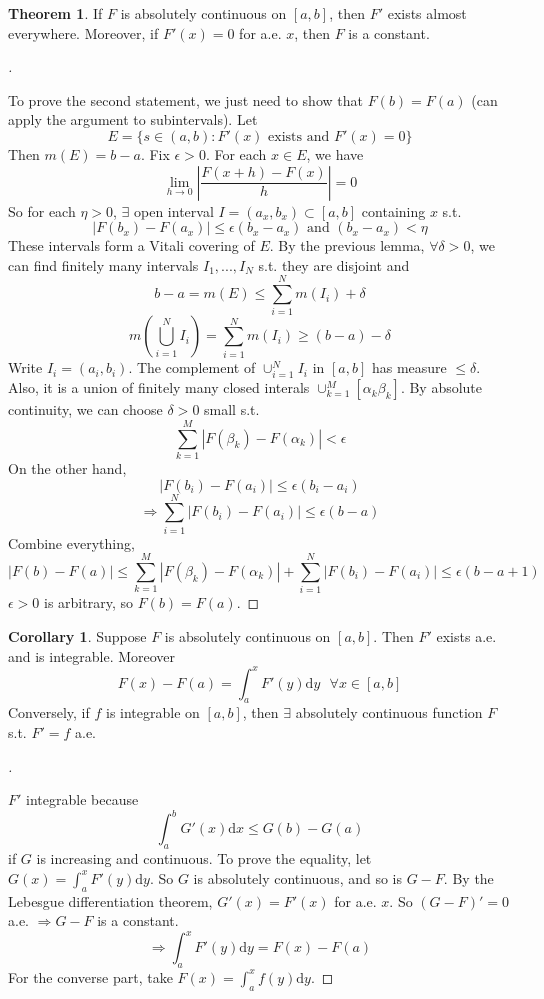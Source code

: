 \documentclass{article}
\newcommand{\sfa}{\text{  } \forall}
\theoremstyle{definition}
\theoremstyle{definition}
\newtheorem{thm}{Theorem}
\newtheorem{cor}{Corollary}
\newenvironment{proofs}[1][\proofname]{%
  \begin{proof}[#1]$ $\par\nobreak\ignorespaces
}{%
  \end{proof}
}
\begin{document}
\begin{thm}
  If $F$ is absolutely continuous on $[a, b]$, then $F'$ exists almost everywhere. Moreover, if $F'(x) = 0$ for a.e. $x$, then $F$ is a constant. 
\end{thm} 

\begin{proofs}
  To prove the second statement, we just need to show that $F(b) = F(a)$ (can apply the argument to subintervals). Let 
  \[
    E = \{ s \in (a, b): F'(x) \text{ exists and } F'(x) = 0\}
  \]
  Then $m(E) = b - a$. Fix $\epsilon > 0$. For each $x \in E$, we have 
  \[
    \lim_{h \to 0} \left|\frac{F(x + h) - F(x)}{h}\right| = 0
  \]
  So for each $\eta > 0$, $\exists $ open interval $I = (a_x, b_x) \subset [a, b]$ containing $x$ s.t.
  \[
    |F(b_x) - F(a_x)| \leq \epsilon (b_x - a_x) \text{ and } (b_x - a_x) < \eta
  \]
  These intervals form a Vitali covering of $E$. By the previous lemma, $\forall \delta >0 $, we can find finitely many intervals $I_1, ..., I_N$ s.t. they are disjoint and 
  \[
    b - a = m(E) \leq \sum_{i = 1}^N m(I_i) + \delta
  \]
  \[
    m \left( \bigcup_{i = 1}^N I_i \right) = \sum_{i = 1}^N m(I_i) \geq (b - a) - \delta 
  \]
  Write $I_i = (a_i, b_i)$. The complement of $\cup_{i = 1}^N I_i$ in $[a, b]$ has measure $\leq \delta$. Also, it is a union of finitely many closed interals $\cup_{k = 1}^M [\alpha_k \beta_k]$. By absolute continuity, we can choose $\delta > 0$ small s.t.
  \[
    \sum_{k = 1}^M |F(\beta_k) - F(\alpha_k)| < \epsilon
  \]
  On the other hand, 
  \[
    |F(b_i) - F(a_i)| \leq \epsilon (b_i - a_i)
  \]
  \[
    \Rightarrow \sum_{i = 1}^N |F(b_i) - F(a_i)| \leq \epsilon (b - a)
  \]
  Combine everything, 
  \[
    |F(b) - F(a)| \leq \sum_{k = 1}^M |F(\beta_k) - F(\alpha_k)| + \sum_{i = 1}^N |F(b_i) - F(a_i)| \leq \epsilon(b - a + 1)
  \]
  $\epsilon > 0$ is arbitrary, so $F(b) = F(a)$. 

\end{proofs}

\begin{cor}
  Suppose $F$ is absolutely continuous on $[a, b]$. Then $F'$ exists a.e. and is integrable. Moreover 
  \[
    F(x) - F(a) = \int_a^x F'(y) \mathrm{d} y \sfa x \in [a, b]
  \]
  Conversely, if $f$ is integrable on $[a, b]$, then $\exists$ absolutely continuous function $F$ s.t. $F' = f$ a.e.
\end{cor}

\begin{proofs}
  $F'$ integrable because 
  \[
    \int_a^b G'(x) \mathrm{d} x \leq G(b) - G(a)
  \]
  if $G$ is increasing and continuous. To prove the equality, let $G(x) = \int_a^x F'(y) \mathrm{d} y$. So $G$ is absolutely continuous, and so is $G - F$.  By the Lebesgue differentiation theorem, $G'(x) = F'(x)$ for a.e. $x$. So $(G - F)' = 0$ a.e. $\Rightarrow G - F$ is a constant. 
  \[
    \Rightarrow \int_a^x F'(y) \mathrm{d} y = F(x) - F(a)
  \]
  For the converse part, take $F(x) = \int_a^x f(y) \mathrm{d} y$. 
\end{proofs}
\end{document}
